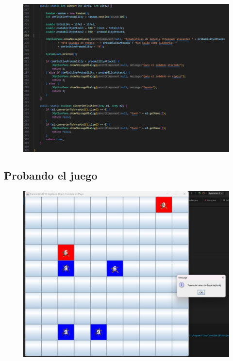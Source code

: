 \documentclass{article}
\begin{document}
		\begin{figure}[H]
		\centering
		\includegraphics[width=1\textwidth,keepaspectratio]{img/winner.png}
	\end{figure}
	
	
	
	\subsection{Probando el juego}
	
	
	
	\begin{figure}[H]
		\centering
		\includegraphics[width=1\textwidth,keepaspectratio]{img/test.jpg}
	\end{figure}
	
\end{document}

